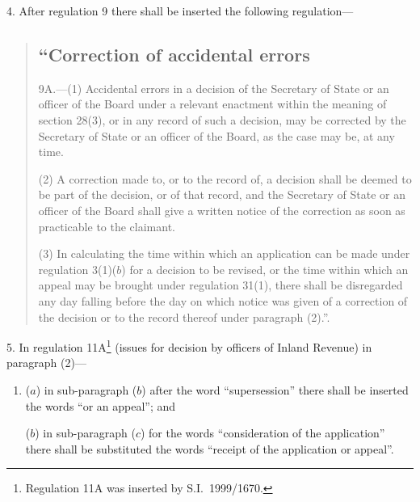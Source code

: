 \documentclass[12pt,a4paper]{article}
\begin{document}
4.  After regulation 9 there shall be inserted the following regulation—
\begin{quotation}
\subsection*{“Correction of accidental errors}

9A.---(1)  Accidental errors in a decision of the Secretary of State or an officer of the Board under a relevant enactment within the meaning of section 28(3), or in any record of such a decision, may be corrected by the Secretary of State or an officer of the Board, as the case may be, at any time.

(2) A correction made to, or to the record of, a decision shall be deemed to be part of the decision, or of that record, and the Secretary of State or an officer of the Board shall give a written notice of the correction as soon as practicable to the claimant.

(3) In calculating the time within which an application can be made under regulation 3(1)($b$)  for a decision to be revised, or the time within which an appeal may be brought under regulation 31(1), there shall be disregarded any day falling before the day on which notice was given of a correction of the decision or to the record thereof under paragraph (2).”.
\end{quotation}

\medskip

5.  In regulation 11A\footnote{Regulation 11A was inserted by S.I.\ 1999/1670.} (issues for decision by officers of Inland Revenue) in paragraph (2)—
\begin{enumerate}\item[]
($a$) in sub-paragraph ($b$)  after the word “supersession” there shall be inserted the words “or an appeal”; and

($b$) in sub-paragraph ($c$)  for the words “consideration of the application” there shall be substituted the words “receipt of the application or appeal”.
\end{enumerate}

\medskip
\end{document}
